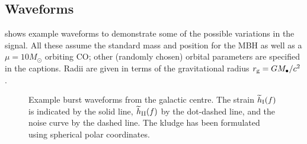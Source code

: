 \subsection{Waveforms}\label{sec:wave-ex}

 shows example waveforms to demonstrate some of the possible variations in the signal. All these assume the standard mass and position for the MBH as well as a $\mu = 10 M_\odot$ orbiting CO; other (randomly chosen) orbital parameters are specified in the captions. Radii are given in terms of the gravitational radius $r_\mathrm{g} = GM_\bullet / c^2$.
\begin{figure}[!htp]
  \begin{center}
    \quad
\caption{Example burst waveforms from the galactic centre. The strain $\widetilde{h}_\mathrm{I}(f)$ is indicated by the solid line, $\widetilde{h}_\mathrm{II}(f)$ by the dot-dashed line, and the noise curve by the dashed line. The kludge has been formulated using spherical polar coordinates.\label{fig:Examples}}
  \end{center}
\end{figure}

